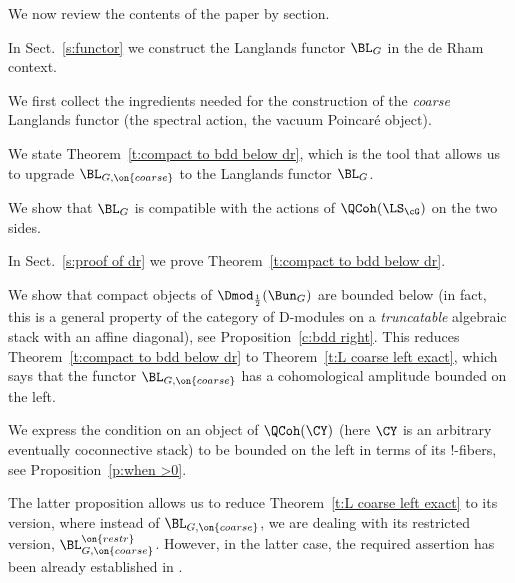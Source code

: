 \documentclass[9pt]{amsart}
\theoremstyle{remark}
\theoremstyle{definition}
\theoremstyle{remark}
\newcommand{\thmref}[1]{Theorem~\ref{#1}}
\newcommand{\secref}[1]{Sect.~\ref{#1}}
\newcommand{\propref}[1]{Proposition~\ref{#1}}
\numberwithin{equation}{section}
\begin{document}
%



We now review the contents of the paper by section.

\sssec{}

In \secref{s:functor} we construct the Langlands functor $\BL_G$ in the
de Rham context.

\medskip

We first collect the ingredients needed for the construction of the 
\emph{coarse} Langlands functor (the spectral action, the vacuum Poincar\'e object).

\medskip

We state \thmref{t:compact to bdd below dr}, which is the tool that allows us to upgrade 
$\BL_{G,\on{coarse}}$ to the Langlands functor $\BL_G$. 

\medskip

We show that $\BL_G$ is compatible with the actions of $\QCoh(\LS_\cG)$ on the two sides. 

\sssec{}

In \secref{s:proof of dr} we prove \thmref{t:compact to bdd below dr}.

\medskip

We show that compact objects of $\Dmod_{\frac{1}{2}}(\Bun_G)$ are bounded below (in fact, this
is a general property of the category of D-modules on a \emph{truncatable} algebraic stack with an
affine diagonal), see \propref{c:bdd right}.  This reduces \thmref{t:compact to bdd below dr} to
\thmref{t:L coarse left exact}, which says that the functor $\BL_{G,\on{coarse}}$ has a cohomological amplitude bounded 
on the left.

\medskip

We express the condition on an object of $\QCoh(\CY)$ (here $\CY$ is an arbitrary eventually coconnective stack)
to be bounded on the left in terms of its !-fibers, see \propref{p:when >0}. 

\medskip

The latter proposition allows us to reduce \thmref{t:L coarse left exact} to its version, where instead of $\BL_{G,\on{coarse}}$,
we are dealing with its restricted version, $\BL^{\on{restr}}_{G,\on{coarse}}$. However, in the latter case, the required assertion has
been already established in \cite{FR}. 
\end{document}
